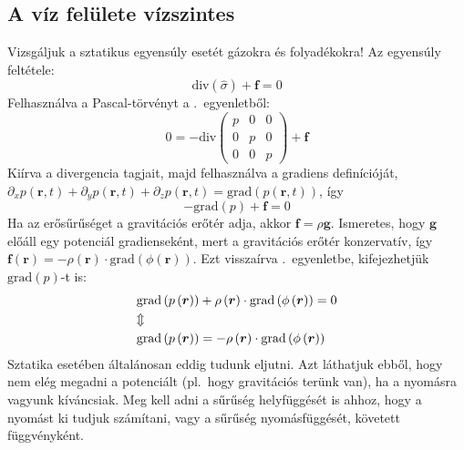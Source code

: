 \documentclass[12pt,a4paper]{scrartcl}
\let\mathbf\bm
\begin{document}
\subsection{A víz felülete vízszintes}
Vizsgáljuk a sztatikus egyensúly esetét gázokra és folyadékokra! Az egyensúly feltétele:
\[{\text{div}}\left( \hat \sigma  \right) + {\mathbf{f}} = 0\]
Felhasználva a Pascal-törvényt a .\ egyenletből:
\[0 =  - {\text{div}}\left( {\begin{array}{*{20}{c}}
  p&0&0 \\ 
  0&p&0 \\ 
  0&0&p 
\end{array}} \right) + {\mathbf{f}}\]
Kiírva a divergencia tagjait, majd felhasználva a gradiens definícióját, ${\partial _x}p\left( {{\mathbf{r}},t} \right) + {\partial _y}p\left( {{\mathbf{r}},t} \right) + {\partial _z}p\left( {{\mathbf{r}},t} \right) = {\text{grad}}\left( {p\left( {{\mathbf{r}},t} \right)} \right)$, így 
\begin{equation} \label{eq:stacionarius}
 - {\text{grad}}\left( p \right) + {\mathbf{f}} = 0
\end{equation}
Ha az erősűrűséget a gravitációs erőtér adja, akkor ${\mathbf{f}} = \rho {\mathbf{g}}$. Ismeretes, hogy ${\mathbf{g}}$ előáll egy potenciál gradienseként, mert a gravitációs erőtér konzervatív, így ${\mathbf{f}}\left( {\mathbf{r}} \right) =  - \rho \left( {\mathbf{r}} \right) \cdot {\text{grad}}\left( {\phi \left( {\mathbf{r}} \right)} \right)$. Ezt visszaírva .\ egyenletbe, kifejezhetjük ${\text{grad}}\left( p \right)$-t is:
\begin{gather} \label{eq:stac_pot}
  {\text{grad}}\left( {p\left( {\mathbf{r}} \right)} \right) + \rho \left( {\mathbf{r}} \right) \cdot {\text{grad}}\left( {\phi \left( {\mathbf{r}} \right)} \right) = 0 \hfill \\
   \Updownarrow  \hfill \nonumber \\
  {\text{grad}}\left( {p\left( {\mathbf{r}} \right)} \right) =  - \rho \left( {\mathbf{r}} \right) \cdot {\text{grad}}\left( {\phi \left( {\mathbf{r}} \right)} \right) \hfill \label{eq:stac_pot_gradp}
\end{gather}
Sztatika esetében általánosan eddig tudunk eljutni. Azt láthatjuk ebből, hogy nem elég megadni a potenciált (pl.\ hogy gravitációs terünk van), ha a nyomásra vagyunk kíváncsiak. Meg kell adni a sűrűség helyfüggését is ahhoz, hogy a nyomást ki tudjuk számítani, vagy a sűrűség nyomásfüggését, követett függvényként.
\end{document}
